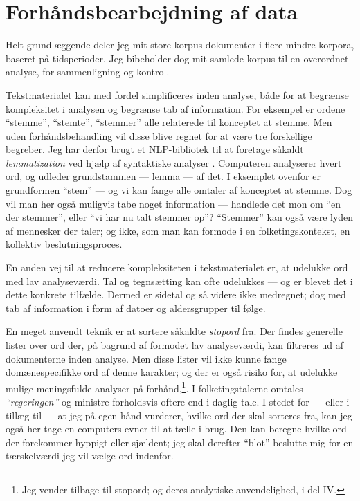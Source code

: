 \section{Forhåndsbearbejdning af data}\label{sec:preproc}

Helt grundlæggende deler jeg mit store korpus dokumenter i flere mindre korpora, baseret på tidsperioder.
Jeg bibeholder dog mit samlede korpus til en overordnet analyse, for sammenligning og kontrol.

Tekstmaterialet kan med fordel simplificeres inden analyse, både for at begrænse kompleksitet i analysen og begrænse tab af information.
For eksempel er ordene “stemme”, “stemte”, “stemmer” alle relaterede til konceptet at stemme.
Men uden forhåndsbehandling vil disse blive regnet for at være tre forskellige begreber.
Jeg har derfor brugt et NLP-bibliotek \autocite{strakaUDPipeUFAL2020} til at foretage såkaldt \textit{lemmatization} ved hjælp af syntaktiske analyser \autocite[s. 28]{kwartlerTextMiningPractice2017}.
Computeren analyserer hvert ord, og udleder grundstammen --- lemma — af det. I eksemplet ovenfor er grundformen “stem” — og vi kan fange alle omtaler af konceptet at stemme.
Dog vil man her også muligvis tabe noget information — handlede det mon om “en der stemmer”, eller “vi har nu talt stemmer op”?
“Stemmer” kan også være lyden af mennesker der taler; og ikke, som man kan formode i en folketingskontekst, en kollektiv beslutningsproces.

En anden vej til at reducere kompleksiteten i tekstmaterialet er, at udelukke ord med lav analyseværdi.
Tal og tegnsætting kan ofte udelukkes — og er blevet det i dette konkrete tilfælde.
Dermed er sidetal og så videre ikke medregnet; dog med tab af information i form af datoer og aldersgrupper til følge.

En meget anvendt teknik er at sortere såkaldte \textit{stopord} fra.
Der findes generelle lister over ord der, på bagrund af formodet lav analyseværdi, kan filtreres ud af dokumenterne inden analyse.
Men disse lister vil ikke kunne fange domænespecifikke ord af denne karakter; og der er også risiko for, at udelukke mulige meningsfulde analyser på forhånd,\autocite[s. 27]{manningIntroductionInformationRetrieval2008}\footnote{Jeg vender tilbage til stopord;
og deres analytiske anvendelighed, i del IV.}.
I folketingstalerne omtales \textit{“regeringen”} og ministre forholdsvis oftere end i daglig tale.
I stedet for — eller i tillæg til — at jeg på egen hånd vurderer, hvilke ord der skal sorteres fra, kan jeg også her tage en computers evner til at tælle i brug.
Den kan beregne hvilke ord der forekommer hyppigt eller sjældent; jeg skal derefter “blot” beslutte mig for en tærskelværdi jeg vil vælge ord indenfor.

